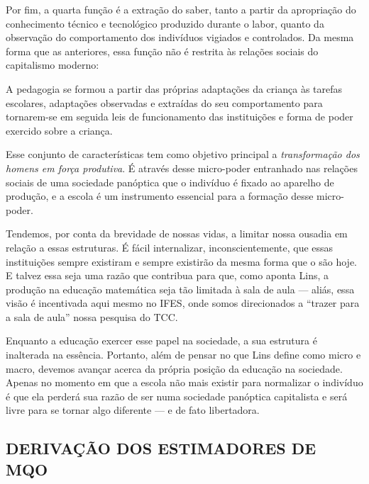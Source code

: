 \documentclass[
  12pt,
  letterpaper,
  DIV=11,
  numbers=noendperiod]{scrartcl}
\newenvironment{citacao}
    {\begin{quoting}[rightmargin=0cm,leftmargin=4cm]
    \begin{singlespace}
    \footnotesize
    }
    {\end{singlespace}
    \end{quoting}
}
\begin{document}
Por fim, a quarta função é a extração do saber, tanto a partir da
apropriação do conhecimento técnico e tecnológico produzido durante o
labor, quanto da observação do comportamento dos indivíduos vigiados e
controlados. Da mesma forma que as anteriores, essa função não é
restrita às relações sociais do capitalismo moderno:

\begin{citacao}
A pedagogia se formou a partir das próprias adaptações da criança às tarefas escolares, adaptações observadas e extraídas do seu comportamento para tornarem-se em seguida leis de funcionamento das instituições e forma de poder exercido sobre a criança. \citep[p.~122]{foucault}
\end{citacao}

Esse conjunto de características tem como objetivo principal a
\emph{transformação dos homens em força produtiva}. É através desse
micro-poder entranhado nas relações sociais de uma sociedade panóptica
que o indivíduo é fixado ao aparelho de produção, e a escola é um
instrumento essencial para a formação desse micro-poder.

Tendemos, por conta da brevidade de nossas vidas, a limitar nossa
ousadia em relação a essas estruturas. É fácil internalizar,
inconscientemente, que essas instituições sempre existiram e sempre
existirão da mesma forma que o são hoje. E talvez essa seja uma razão
que contribua para que, como aponta Lins, a produção na educação
matemática seja tão limitada à sala de aula --- aliás, essa visão é
incentivada aqui mesmo no IFES, onde somos direcionados a ``trazer para
a sala de aula'' nossa pesquisa do TCC.

Enquanto a educação exercer esse papel na sociedade, a sua estrutura é
inalterada na essência. Portanto, além de pensar no que Lins define como
micro e macro, devemos avançar acerca da própria posição da educação na
sociedade. Apenas no momento em que a escola não mais existir para
normalizar o indivíduo é que ela perderá sua razão de ser numa sociedade
panóptica capitalista e será livre para se tornar algo diferente --- e
de fato libertadora.

\newpage

\hypertarget{derivauxe7uxe3o-dos-estimadores-de-mqo}{%
\subsection{DERIVAÇÃO DOS ESTIMADORES DE
MQO}\label{derivauxe7uxe3o-dos-estimadores-de-mqo}}
\end{document}
